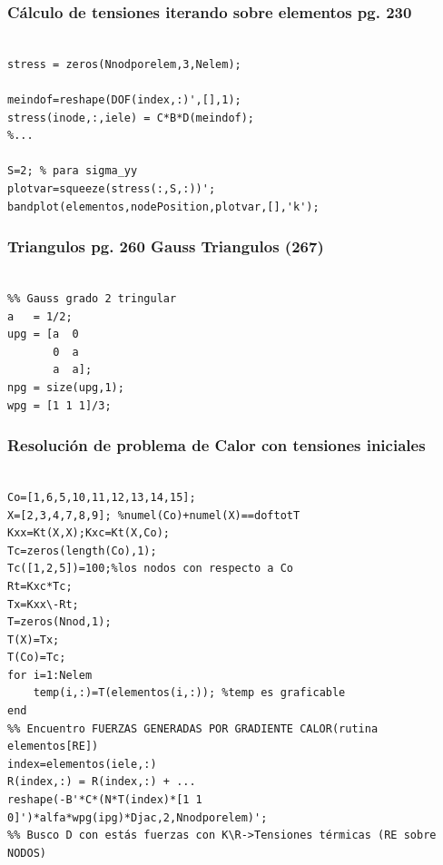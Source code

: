 \subsubsection{Cálculo de tensiones iterando sobre elementos pg. 230}
\begin{code}
\begin{verbatim}

stress = zeros(Nnodporelem,3,Nelem);

meindof=reshape(DOF(index,:)',[],1);
stress(inode,:,iele) = C*B*D(meindof);
%...

S=2; % para sigma_yy
plotvar=squeeze(stress(:,S,:))';
bandplot(elementos,nodePosition,plotvar,[],'k');
\end{verbatim}
\end{code}

\subsubsection{Triangulos pg. 260  Gauss Triangulos (267)}
\begin{code}
\begin{verbatim}
    
%% Gauss grado 2 tringular
a   = 1/2;
upg = [a  0
       0  a
       a  a];    
npg = size(upg,1);
wpg = [1 1 1]/3;
\end{verbatim}
\end{code}
\subsubsection*{Resolución de problema de Calor con tensiones iniciales}
\begin{code}\label{cod:calorDesconocidos}
\begin{verbatim}

Co=[1,6,5,10,11,12,13,14,15];
X=[2,3,4,7,8,9]; %numel(Co)+numel(X)==doftotT
Kxx=Kt(X,X);Kxc=Kt(X,Co);
Tc=zeros(length(Co),1);
Tc([1,2,5])=100;%los nodos con respecto a Co
Rt=Kxc*Tc;
Tx=Kxx\-Rt;
T=zeros(Nnod,1);
T(X)=Tx;
T(Co)=Tc;
for i=1:Nelem
    temp(i,:)=T(elementos(i,:)); %temp es graficable
end
%% Encuentro FUERZAS GENERADAS POR GRADIENTE CALOR(rutina elementos[RE])
index=elementos(iele,:)
R(index,:) = R(index,:) + ...
reshape(-B'*C*(N*T(index)*[1 1 0]')*alfa*wpg(ipg)*Djac,2,Nnodporelem)';
%% Busco D con estás fuerzas con K\R->Tensiones térmicas (RE sobre NODOS)
\end{verbatim}
\end{code}

